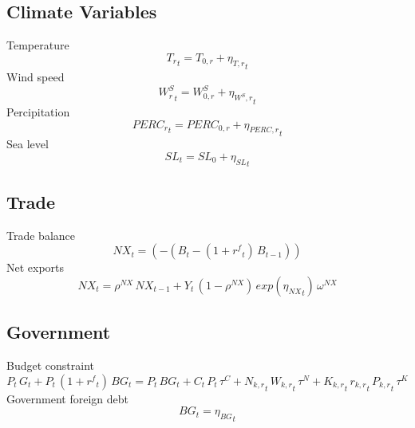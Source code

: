 \subsection{Climate Variables}
Temperature
\begin{dmath}
{{T_{r}}_{t}}={{T_{0,r}}}+{{\eta_{T,r}}_{t}}
\end{dmath}
Wind speed
\begin{dmath}
{{W_{r}^{S}}_{t}}={{W^{S}_{0,r}}}+{{\eta_{W^{S},r}}_{t}}
\end{dmath}
Percipitation
\begin{dmath}
{{PERC_{r}}_{t}}={{PERC_{0,r}}}+{{\eta_{PERC,r}}_{t}}
\end{dmath}
Sea level
\begin{dmath}
{{SL}_{t}}={{SL_0}}+{{\eta_{SL}}_{t}}
\end{dmath}

\subsection{Trade}
Trade balance
\begin{dmath}
{NX_{t}}=\left(-\left({B_{t}}-\left(1+{{r^{f}}_{t}}\right)\, {B_{t-1}}\right)\right)
\end{dmath}
Net exports
\begin{dmath}
{NX_{t}}={{\rho^{NX}}}\, {NX_{t-1}}+{Y_{t}}\, \left(1-{{\rho^{NX}}}\right)\, exp\left({{\eta_{NX}}_{t}}\right)\, {{\omega^{NX}}}
\end{dmath}

\subsection{Government}
Budget constraint
\begin{dmath}
{P_{t}}\, {G_{t}}+{P_{t}}\, \left(1+{{r^{f}}_{t}}\right)\, {BG_{t}}={P_{t}}\, {BG_{t}}+{C_{t}}\, {P_{t}}\, {{\tau^{C}}}+{{N_{k,r}}_{t}}\, {{W_{k,r}}_{t}}\, {{\tau^{N}}}+{{K_{k,r}}_{t}}\, {{r_{k,r}}_{t}}\, {{P_{k,r}}_{t}}\, {{\tau^{K}}}
\end{dmath}
Government foreign debt
\begin{dmath}
{BG_{t}}={{\eta_{BG}}_{t}}
\end{dmath}

